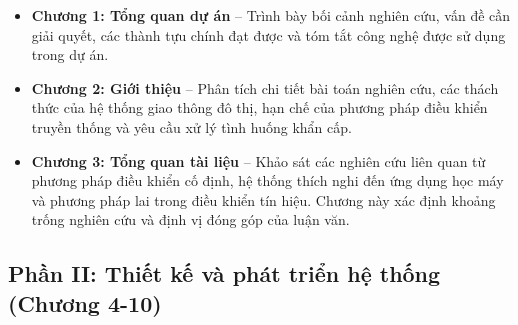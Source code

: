 \begin{itemize}[leftmargin=1.5em]
    \item \textbf{Chương 1: Tổng quan dự án} -- Trình bày bối cảnh nghiên cứu, vấn đề cần giải quyết, các thành tựu chính đạt được và tóm tắt công nghệ được sử dụng trong dự án.
    
    \item \textbf{Chương 2: Giới thiệu} -- Phân tích chi tiết bài toán nghiên cứu, các thách thức của hệ thống giao thông đô thị, hạn chế của phương pháp điều khiển truyền thống và yêu cầu xử lý tình huống khẩn cấp.
    
    \item \textbf{Chương 3: Tổng quan tài liệu} -- Khảo sát các nghiên cứu liên quan từ phương pháp điều khiển cố định, hệ thống thích nghi đến ứng dụng học máy và phương pháp lai trong điều khiển tín hiệu. Chương này xác định khoảng trống nghiên cứu và định vị đóng góp của luận văn.
\end{itemize}

\subsection*{Phần II: Thiết kế và phát triển hệ thống (Chương 4-10)}

